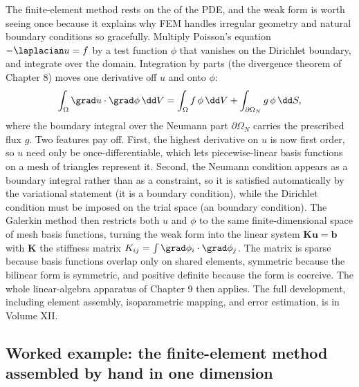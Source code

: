 \begin{mastery}
The finite-element method rests on the  of the
PDE, and the weak form is worth seeing once because it explains why
FEM handles irregular geometry and natural boundary conditions so
gracefully. Multiply Poisson's equation $-\laplacian u = f$ by a
test function $\phi$ that vanishes on the Dirichlet boundary, and
integrate over the domain. Integration by parts (the divergence
theorem of Chapter 8) moves one derivative off $u$ and onto $\phi$:
\[
\int_{\Omega} \grad u \cdot \grad \phi \,\dd V = \int_{\Omega} f\,\phi\,\dd V + \int_{\partial\Omega_{N}} g\,\phi\,\dd S,
\]
where the boundary integral over the Neumann part $\partial
\Omega_{N}$ carries the prescribed flux $g$. Two features pay off.
First, the highest derivative on $u$ is now first order, so $u$ need
only be once-differentiable, which lets piecewise-linear basis
functions on a mesh of triangles represent it. Second, the Neumann
condition appears as a boundary integral rather than as a
constraint, so it is satisfied automatically by the variational
statement (it is a  boundary condition), while the
Dirichlet condition must be imposed on the trial space (an
 boundary condition). The Galerkin method then
restricts both $u$ and $\phi$ to the same finite-dimensional space
of mesh basis functions, turning the weak form into the linear
system $\mathbf{K}\mathbf{u} = \mathbf{b}$ with $\mathbf{K}$ the
stiffness matrix $K_{ij} = \int \grad\phi_{i}\cdot\grad\phi_{j}$.
The matrix is sparse because basis functions overlap only on shared
elements, symmetric because the bilinear form is symmetric, and
positive definite because the form is coercive. The whole
linear-algebra apparatus of Chapter 9 then applies. The full
development, including element assembly, isoparametric mapping, and
error estimation, is in Volume XII.
\end{mastery}

\subsection{Worked example: the finite-element method assembled by hand in one dimension}

